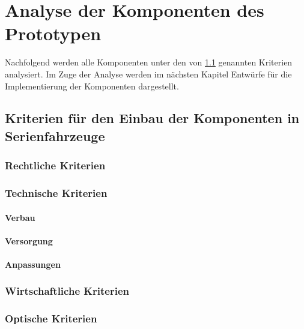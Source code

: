 \chapter{Analyse der Komponenten des Prototypen}
\label{cha:Analyse}
Nachfolgend werden alle Komponenten unter den von \ref{cha:Kriterien} genannten Kriterien analysiert. Im Zuge der Analyse werden im nächsten Kapitel Entwürfe für die Implementierung der Komponenten dargestellt.
\section{Kriterien für den Einbau der Komponenten in Serienfahrzeuge}
\label{cha:Kriterien}
\subsection{Rechtliche Kriterien}
\subsection{Technische Kriterien}
\subsubsection{Verbau}
\subsubsection{Versorgung}
\subsubsection{Anpassungen}
\subsection{Wirtschaftliche Kriterien}
\subsection{Optische Kriterien}